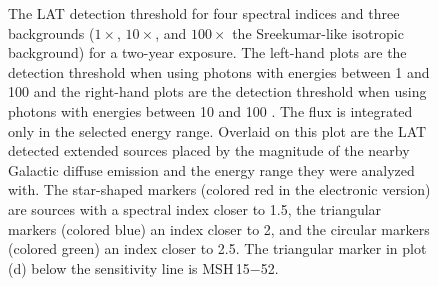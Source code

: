 \documentclass[12pt,preprint]{aastex}
\newif\ifcolorfigure
\newcommand{\gev}{\text{GeV}\xspace}
\begin{document}
\clearpage
\begin{figure}
    \ifcolorfigure
    \plotone{mc_plots/all_sensitivity_color.eps}
    \else
    \fi
    \caption{The LAT detection threshold for four spectral indices
    and three backgrounds ($1\times$, $10\times$, and $100\times$ the
    Sreekumar-like isotropic background) for a two-year exposure. The
    left-hand plots are the detection threshold when using 
    photons with energies between
    1 \gev and 100 \gev
    and the right-hand plots are the detection threshold when using
    photons with energies between
    10 \gev and 100 \gev.  The flux is integrated only in the
    selected energy range.  Overlaid on this plot are the LAT detected
    extended sources placed by the magnitude of the nearby Galactic
    diffuse emission and the energy range they were analyzed with.
    The star-shaped markers (colored red in the electronic version)
    are sources with a spectral index closer to 1.5, the triangular
    markers (colored blue) an index closer to 2, and the circular markers
    (colored green) an index closer to 2.5.  The triangular marker in plot
    (d) below the sensitivity line is MSH\,15$-$52.
    }\label{all_sensitivity} 
  \end{figure}
\end{document}
